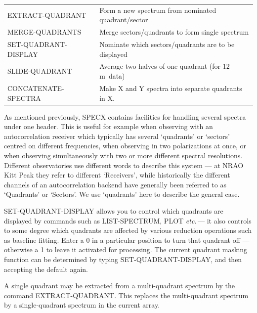 \documentclass[11pt,twoside]{report}
\newcommand{\etc}{{\it etc.\,}}
\newcommand{\m}{{\rm\,m}}
\begin{document}
\begin{tabular}{ll}
EXTRACT-QUADRANT       & Form a new spectrum from nominated quadrant/sector\\
MERGE-QUADRANTS        & Merge sectors/quadrants to form single spectrum\\
SET-QUADRANT-DISPLAY   & Nominate which sectors/quadrants are to be displayed\\
SLIDE-QUADRANT         & Average two halves of one quadrant (for 12\m\ data)\\
CONCATENATE-SPECTRA    & Make X and Y spectra into separate quadrants in X.\\
\end{tabular}

As mentioned previously, SPECX contains facilities for handling several spectra
under one header. This is useful for example when observing with an
autocorrelation receiver  which typically
has several `quadrants' or `sectors' centred on different frequencies, when
observing in two polarizations  at once, or when
observing simultaneously with two or more different spectral resolutions.
 Different observatories use different words to
describe this system --- at NRAO Kitt Peak they refer to different `Receivers',
 while historically the different channels of an
autocorrelation backend have generally been referred to as `Quadrants' or
`Sectors'. We use `quadrants' here to describe the general case.

SET-QUADRANT-DISPLAY allows you to control which quadrants are displayed by
commands such as LIST-SPECTRUM, PLOT \etc --- it also controls to some degree
which quadrants are affected by various reduction operations
such as baseline fitting. Enter a 0 in a particular position to turn that
quadrant off --- otherwise a 1 to leave it activated for processing. The current
quadrant masking function can be determined by
typing SET-QUADRANT-DISPLAY, and then accepting the default again.

 A single quadrant may be extracted
from a multi-quadrant spectrum by the command EXTRACT-QUADRANT. This replaces
the multi-quadrant spectrum by a single-quadrant spectrum in the current array.
\end{document}
